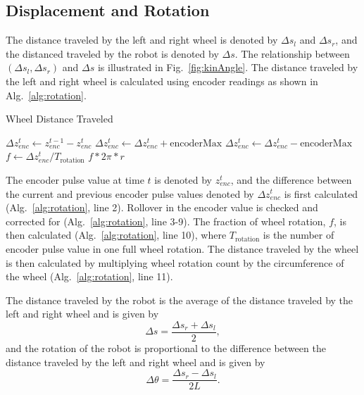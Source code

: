 \documentclass[conference]{../IEEEtran}
\begin{document}
\subsection{Displacement and Rotation}

The distance traveled by the left and right wheel is denoted by $\Delta s_l$ and
$\Delta s_r$, and the distanced traveled by the robot is denoted by $\Delta s$.
The relationship between $(\Delta s_l, \Delta s_r)$ and $\Delta s$ is illustrated in
Fig.~\ref{fig:kinAngle}. The distance traveled by the left and right wheel is calculated
using encoder readings as shown in Alg.~\ref{alg:rotation}.

\begin{algorithm}[b]
  \caption{Wheel Distance Traveled}
  \begin{algorithmic}[1]
      \State $\Delta z_{enc}^{t} \gets z_{enc}^{t-1} - z_{enc}^{t}$
      \medskip
          \State $\Delta z_{enc}^{t} \gets \Delta z_{enc}^{t} + \text{encoderMax}$
        \Else
          \State $\Delta z_{enc}^{t} \gets \Delta z_{enc}^{t} - \text{encoderMax}$
        \EndIf
      \EndIf
      \medskip
      \State $f \gets \Delta z^{t}_{enc} / T_{\text{rotation}}$
      \medskip
      \State \Return $f*2\pi *r$
    \EndFunction{}

    \end{algorithmic}
  \label{alg:rotation}
\end{algorithm}

The encoder pulse value at time $t$ is denoted by $z_{enc}^t$, and
the difference between the current and previous encoder pulse values denoted by $\Delta z_{enc}^t$
is first calculated (Alg.~\ref{alg:rotation}, line 2).
Rollover in the encoder value is checked and corrected for (Alg.~\ref{alg:rotation}, line 3-9).
The fraction of wheel rotation, $f$, is then calculated (Alg.~\ref{alg:rotation}, line 10), where
$T_{\text{rotation}}$ is the number of encoder pulse value in one full wheel rotation.
The distance traveled by the wheel is then calculated by multiplying wheel rotation count by
the circumference of the wheel (Alg.~\ref{alg:rotation}, line 11).

The distance traveled by the robot is the average of the distance traveled by the left and
right wheel and is given by
\begin{equation}
  \Delta s = \frac{\Delta s_r+\Delta s_l}{2},
  \label{eq:midDist}
\end{equation}
and the rotation of the robot is proportional to the difference between the distance
traveled by the left and right wheel and is given by
\begin{equation}
  \Delta \theta = \frac{\Delta s_r-\Delta s_l}{2L}.
  \label{eq:deltTheta}
\end{equation}
\end{document}
